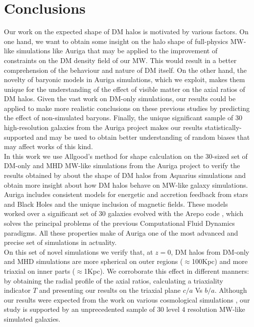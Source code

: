 \chapter{Conclusions}

Our work on the expected shape of DM halos is motivated by various factors. On one hand, we want to obtain some insight on the halo shape of full-physics MW-like simulations like Auriga \cite{auriga} that may be applied to the improvement of constraints on the DM density field of our MW. This would result in a better comprehension of the behaviour and nature of DM itself. On the other hand, the novelty of baryonic models in Auriga simulations, which we exploit, makes them unique for the understanding of the effect of visible matter on the axial ratios of DM halos. Given the vast work on DM-only simulations, our results could be applied to make more realistic conclusions on these previous studies by predicting the effect of non-simulated baryons. Finally, the unique significant sample of 30 high-resolution galaxies from the Auriga project makes our results statistically-supported and may be used to obtain better understanding of random biases that may affect works of this kind.\\  


In this work we use Allgood's method for shape calculation \cite{Allgood_et_al._2006} on the 30-sized set of DM-only and MHD MW-like simulations from the Auriga \cite{auriga} project to verify the results obtained by \cite[Vera-Ciro et al. 2011]{Vera-Ciro_et_al._2011} about the shape of DM halos from Aquarius simulations and obtain more insight about how DM halos behave on MW-like galaxy simulations. Auriga includes consistent models for energetic and accretion feedback from stars and Black Holes and the unique inclusion of magnetic fields. These models worked over a significant set of 30 galaxies evolved with the Arepo code \cite{arepo}, which solves the principal problems of the previous Computational Fluid Dynamics paradigms. All these properties make of Auriga one of the most advanced and precise set of simulations in actuality.\\ 


On this set of novel simulations we verify that, at $z=0$, DM halos from DM-only and MHD simulations are more spherical on outer regions ($\approx$100Kpc) and more triaxial on inner parts ($\approx$1Kpc). We corroborate this effect in different manners: by obtaining the radial profile of the axial ratios, calculating a triaxiality indicator $T$ and presenting our results on the triaxial plane $c/a$  Vs $b/a$. Although our results were expected from the work on various cosmological simulations \cite{Frenk_et_al._1988,Dubinski_and_Carlberg_1991,Warren_et_al._1992,Cole_and_Lacey_1996,Hayashi_et_al._2007,Bett_et_al._2007,Vera-Ciro_et_al._2011}, our study is supported by an unprecedented sample of 30 level 4 resolution MW-like simulated galaxies.\\

